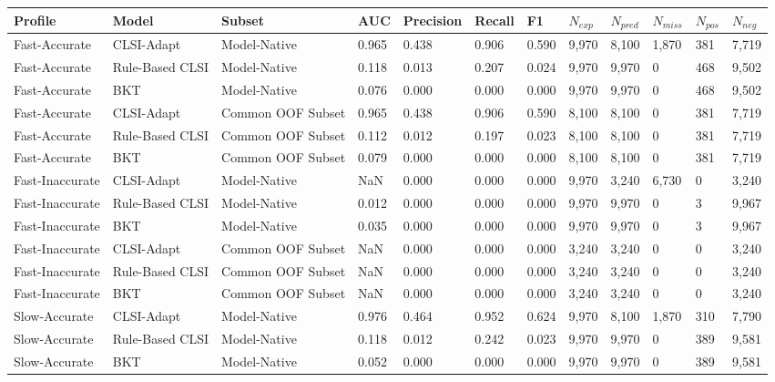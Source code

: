 \begin{table}[ht]
\centering
\begin{tabular}{llllllllllll}
\toprule
Profile & Model & Subset & AUC & Precision & Recall & F1 & $N_{exp}$ & $N_{pred}$ & $N_{miss}$ & $N_{pos}$ & $N_{neg}$ \\
\midrule
Fast-Accurate & CLSI-Adapt & Model-Native & 0.965 & 0.438 & 0.906 & 0.590 & 9,970 & 8,100 & 1,870 & 381 & 7,719 \\
Fast-Accurate & Rule-Based CLSI & Model-Native & 0.118 & 0.013 & 0.207 & 0.024 & 9,970 & 9,970 & 0 & 468 & 9,502 \\
Fast-Accurate & BKT & Model-Native & 0.076 & 0.000 & 0.000 & 0.000 & 9,970 & 9,970 & 0 & 468 & 9,502 \\
Fast-Accurate & CLSI-Adapt & Common OOF Subset & 0.965 & 0.438 & 0.906 & 0.590 & 8,100 & 8,100 & 0 & 381 & 7,719 \\
Fast-Accurate & Rule-Based CLSI & Common OOF Subset & 0.112 & 0.012 & 0.197 & 0.023 & 8,100 & 8,100 & 0 & 381 & 7,719 \\
Fast-Accurate & BKT & Common OOF Subset & 0.079 & 0.000 & 0.000 & 0.000 & 8,100 & 8,100 & 0 & 381 & 7,719 \\
Fast-Inaccurate & CLSI-Adapt & Model-Native & NaN & 0.000 & 0.000 & 0.000 & 9,970 & 3,240 & 6,730 & 0 & 3,240 \\
Fast-Inaccurate & Rule-Based CLSI & Model-Native & 0.012 & 0.000 & 0.000 & 0.000 & 9,970 & 9,970 & 0 & 3 & 9,967 \\
Fast-Inaccurate & BKT & Model-Native & 0.035 & 0.000 & 0.000 & 0.000 & 9,970 & 9,970 & 0 & 3 & 9,967 \\
Fast-Inaccurate & CLSI-Adapt & Common OOF Subset & NaN & 0.000 & 0.000 & 0.000 & 3,240 & 3,240 & 0 & 0 & 3,240 \\
Fast-Inaccurate & Rule-Based CLSI & Common OOF Subset & NaN & 0.000 & 0.000 & 0.000 & 3,240 & 3,240 & 0 & 0 & 3,240 \\
Fast-Inaccurate & BKT & Common OOF Subset & NaN & 0.000 & 0.000 & 0.000 & 3,240 & 3,240 & 0 & 0 & 3,240 \\
Slow-Accurate & CLSI-Adapt & Model-Native & 0.976 & 0.464 & 0.952 & 0.624 & 9,970 & 8,100 & 1,870 & 310 & 7,790 \\
Slow-Accurate & Rule-Based CLSI & Model-Native & 0.118 & 0.012 & 0.242 & 0.023 & 9,970 & 9,970 & 0 & 389 & 9,581 \\
Slow-Accurate & BKT & Model-Native & 0.052 & 0.000 & 0.000 & 0.000 & 9,970 & 9,970 & 0 & 389 & 9,581 \\

\end{tabular}
\end{table}
